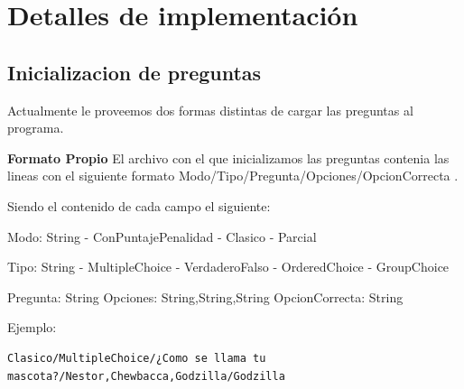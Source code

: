 \documentclass[titlepage,a4paper]{article}
\begin{document}
\section{Detalles de implementación}\label{sec:implementacion}

\subsection{Inicializacion de preguntas}
Actualmente le proveemos dos formas distintas de cargar las preguntas al programa.

\begin{description}
{\bf Formato Propio}\newline
El archivo con el que inicializamos las preguntas contenia las lineas con el siguiente formato Modo/Tipo/Pregunta/Opciones/OpcionCorrecta .\newline
\newline

Siendo el contenido de cada campo el siguiente:\newline
\newline

Modo: String\newline
\indent- ConPuntajePenalidad\newline
\indent- Clasico\newline
\indent- Parcial\newline
\newline

Tipo: String\newline
\indent- MultipleChoice\newline
\indent- VerdaderoFalso\newline
\indent- OrderedChoice\newline
\indent- GroupChoice\newline
\newline

Pregunta: String\newline
\newline
Opciones: String,String,String\newline
\newline
OpcionCorrecta: String\newline
\newline

Ejemplo:\newline
\item
\begin{verbatim}
Clasico/MultipleChoice/¿Como se llama tu mascota?/Nestor,Chewbacca,Godzilla/Godzilla
\end{verbatim}
\newline

\end{description}
\end{document}
